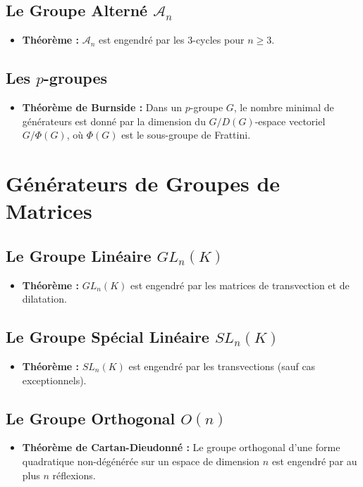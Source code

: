 \documentclass[12pt, a4paper, parskip=full]{report}
\theoremstyle{agregstyle}
\begin{document}
\subsection{Le Groupe Alterné $\mathcal{A}_n$}
\begin{itemize}
    \item \textbf{Théorème :} $\mathcal{A}_n$ est engendré par les 3-cycles pour $n \ge 3$.
\end{itemize}
\subsection{Les $p$-groupes}
\begin{itemize}
    \item \textbf{Théorème de Burnside :} Dans un $p$-groupe $G$, le nombre minimal de générateurs est donné par la dimension du $G/D(G)$-espace vectoriel $G/\Phi(G)$, où $\Phi(G)$ est le sous-groupe de Frattini.
\end{itemize}

\section{Générateurs de Groupes de Matrices}
\subsection{Le Groupe Linéaire $GL_n(K)$}
\begin{itemize}
    \item \textbf{Théorème :} $GL_n(K)$ est engendré par les matrices de transvection et de dilatation.
\end{itemize}
\subsection{Le Groupe Spécial Linéaire $SL_n(K)$}
\begin{itemize}
    \item \textbf{Théorème :} $SL_n(K)$ est engendré par les transvections (sauf cas exceptionnels).
\end{itemize}
\subsection{Le Groupe Orthogonal $O(n)$}
\begin{itemize}
    \item \textbf{Théorème de Cartan-Dieudonné :} Le groupe orthogonal d'une forme quadratique non-dégénérée sur un espace de dimension $n$ est engendré par au plus $n$ réflexions.
\end{itemize}
\end{document}
